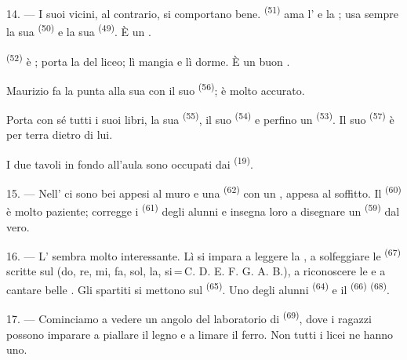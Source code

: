 14. --- I suoi vicini, al contrario, si comportano bene. 
\textsuperscript{(51)} ama l' e la ; usa sempre la sua
 \textsuperscript{(50)} e la sua  \textsuperscript{(49)}.
È un .

 \textsuperscript{(52)} è ; porta la
 del liceo; lì mangia e lì dorme. È un buon .

Maurizio fa la punta alla sua  con il suo 
\textsuperscript{(56)}; è molto accurato.

Porta con sé tutti i suoi libri, la sua  \textsuperscript{(55)}, il
suo  \textsuperscript{(54)} e perfino un 
\textsuperscript{(53)}. Il suo  \textsuperscript{(57)} è per terra
dietro di lui.

I due tavoli in fondo all'aula sono occupati dai 
\textsuperscript{(19)}.

\VUsaut{4.6mm}
\VUsaut{3.4mm}

15. --- Nell' ci sono bei  appesi al muro e
una  \textsuperscript{(62)} con un , appesa al
soffitto. Il  \textsuperscript{(60)} è molto paziente; corregge i
 \textsuperscript{(61)} degli alunni e insegna loro a disegnare un
 \textsuperscript{(59)} dal vero.

16. --- L' sembra molto interessante. Lì si impara a leggere
la , a solfeggiare le 
\textsuperscript{(67)} scritte sul  (do, re, mi, fa, sol, la,
si\,=\,C. D. E. F. G. A. B.), a riconoscere le  e a cantare belle
. Gli spartiti si mettono sul 
\textsuperscript{(65)}. Uno degli alunni 
\textsuperscript{(64)} e il  \textsuperscript{(66)}
 \textsuperscript{(68)}.

17. --- Cominciamo a vedere un angolo del laboratorio di 
\textsuperscript{(69)}, dove i ragazzi possono imparare a piallare il legno e a
limare il ferro. Non tutti i licei ne hanno uno.

